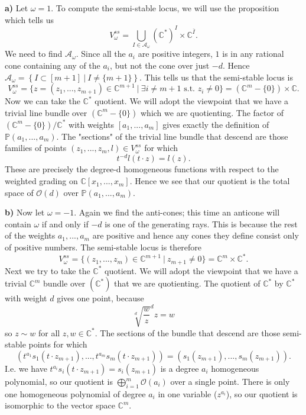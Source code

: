 \documentclass{article}
\newcommand{\C}{\mathbb{C}}
\newcommand{\bP}{\mathbb{P}}
\newcommand{\cA}{\mathcal{A}}
\begin{document}
\noindent \textbf{a)} Let $\omega = 1$. To compute the semi-stable locus, we will use the proposition which tells us
\begin{equation}
    V_\omega^{ss} = \bigcup_{I\in\cA_\omega} (\C^\ast)^I \times \C^{\overline{I}}.
\end{equation}
We need to find $\cA_\omega$. Since all the $a_i$ are positive integers, $1$ is in any rational cone containing any of the $a_i$, but not the cone over just $-d$. Hence $\cA_\omega = \left\{I\subset [m+1] ~|~ I\neq \{m+1\}\right\}.$ This tells us that the semi-stable locus is
\begin{equation}
    V_\omega^{ss} = \{z = (z_1,...,z_{m+1}) \in \C^{m+1} ~|~ \exists i\neq m+1 \text{ s.t. } z_i \neq 0 \} = (\C^m - \{0\})\times \C.
\end{equation}
Now we can take the $\C^\ast$ quotient. We will adopt the viewpoint that we have a trivial line bundle over $(\C^m-\{0\})$ which we are quotienting. The factor of $(\C^m-\{0\})/\C^\ast$ with weights $[a_1,...,a_m]$ gives exactly the definition of $\bP(a_1,...,a_m)$. The "sections" of the trivial line bundle that descend are those families of points $(z_1,...,z_m,l)\in V^{ss}_\omega$ for which
\begin{equation}
    t^{-d} l(t\cdot z) = l(z).
\end{equation}
These are precisely the degree-d homogeneous functions with respect to the weighted grading on $\C[x_1,...,x_m]$. Hence we see that our quotient is the total space of $\mathcal{O}(d)$ over $\bP(a_1,...,a_m)$. \vspace*{1em}

\noindent \textbf{b)} Now let $\omega = -1$. Again we find the anti-cones; this time an anticone will contain $\omega$ if and only if $-d$ is one of the generating rays. This is because the rest of the weights $a_1,...,a_m$ are positive and hence any cones they define consist only of positive numbers. The semi-stable locus is therefore
\begin{equation}
    V^{ss}_\omega = \{(z_1,...,z_m)\in \C^{m+1} ~|~ z_{m+1}\neq 0 \} = \C^m \times \C^\ast.
\end{equation}
Next we try to take the $\C^\ast$ quotient. We will adopt the viewpoint that we have a trivial $\C^m$ bundle over $(\C^\ast)$ that we are quotienting. The quotient of $\C^\ast$ by $\C^\ast$ with weight $d$ gives one point, because
$$\sqrt[d]{\frac{w}{z}}^d z = w$$
so $z\sim w$ for all $z,w\in \C^\ast$. The sections of the bundle that descend are those semi-stable points for which
$$(t^{a_1} s_1(t\cdot z_{m+1}),...,t^{a_m}s_m(t\cdot z_{m+1})) = (s_1(z_{m+1}),...,s_m(z_{m+1})).$$ 
I.e. we have $t^{a_i}s_i(t\cdot z_{m+1}) = s_i(z_{m+1})$ is a degree $a_i$ homogeneous polynomial, so our quotient is 
$\bigoplus_{i=1}^m \mathcal{O}(a_i)$ over a single point. There is only one homogeneous polynomial of degree $a_i$ in one variable ($z^{a_i}$), so our quotient is isomorphic to the vector space $\C^m$.
\end{document}
